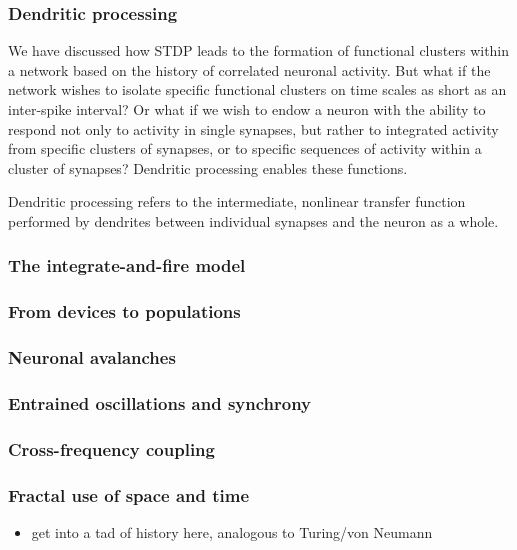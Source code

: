 \documentclass[twocolumn]{article}
\begin{document}
\subsubsection{Dendritic processing}
We have discussed how STDP leads to the formation of functional clusters within a network based on the history of correlated neuronal activity. But what if the network wishes to isolate specific functional clusters on time scales as short as an inter-spike interval? Or what if we wish to endow a neuron with the ability to respond not only to activity in single synapses, but rather to integrated activity from specific clusters of synapses, or to specific sequences of activity within a cluster of synapses? Dendritic processing enables these functions.

Dendritic processing refers to the intermediate, nonlinear transfer function performed by dendrites between individual synapses and the neuron as a whole. 

\subsubsection{The integrate-and-fire model}

\subsubsection{From devices to populations}

\subsubsection{Neuronal avalanches}

\subsubsection{Entrained oscillations and synchrony}

\subsubsection{Cross-frequency coupling}

\subsubsection{Fractal use of space and time}


\begin{itemize}
\item get into a tad of history here, analogous to Turing/von Neumann
\end{itemize}
\end{document}
